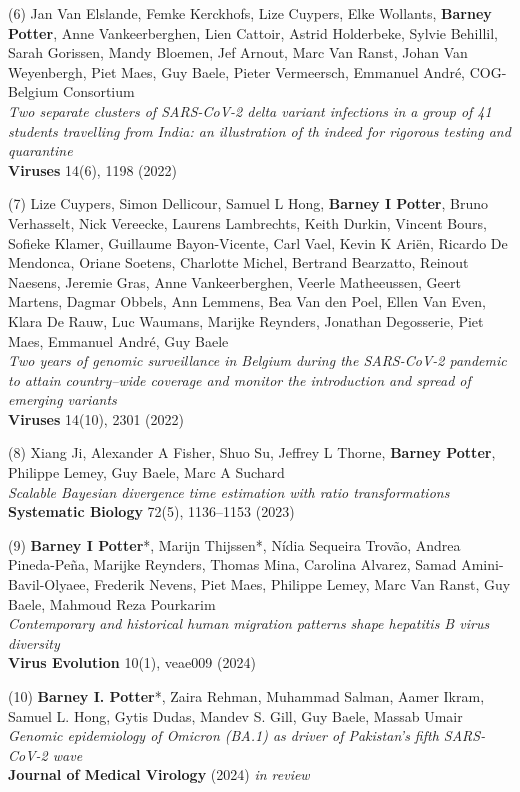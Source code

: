 (6) Jan Van Elslande, Femke Kerckhofs, Lize Cuypers, Elke Wollants, \textbf{Barney Potter}, Anne Vankeerberghen, Lien Cattoir, Astrid Holderbeke, Sylvie Behillil, Sarah Gorissen, Mandy Bloemen, Jef Arnout, Marc Van Ranst, Johan Van Weyenbergh, Piet Maes, Guy Baele, Pieter Vermeersch, Emmanuel André, COG-Belgium Consortium\\
\textit{Two separate clusters of SARS-CoV-2 delta variant infections in a group of 41 students travelling from India: an illustration of th indeed for rigorous testing and quarantine}\\
\textbf{Viruses} 14(6), 1198 (2022)

(7) Lize Cuypers, Simon Dellicour, Samuel L Hong, \textbf{Barney I Potter}, Bruno Verhasselt, Nick Vereecke, Laurens Lambrechts, Keith Durkin, Vincent Bours, Sofieke Klamer, Guillaume Bayon-Vicente, Carl Vael, Kevin K Ariën, Ricardo De Mendonca, Oriane Soetens, Charlotte Michel, Bertrand Bearzatto, Reinout Naesens, Jeremie Gras, Anne Vankeerberghen, Veerle Matheeussen, Geert Martens, Dagmar Obbels, Ann Lemmens, Bea Van den Poel, Ellen Van Even, Klara De Rauw, Luc Waumans, Marijke Reynders, Jonathan Degosserie, Piet Maes, Emmanuel André, Guy Baele\\
\textit{Two years of genomic surveillance in Belgium during the SARS-CoV-2 pandemic to attain country–wide coverage and monitor the introduction and spread of emerging variants}\\
\textbf{Viruses} 14(10), 2301 (2022)

(8) Xiang Ji, Alexander A Fisher, Shuo Su, Jeffrey L Thorne, \textbf{Barney Potter}, Philippe Lemey, Guy Baele, Marc A Suchard\\
\textit{Scalable Bayesian divergence time estimation with ratio transformations}\\
\textbf{Systematic Biology} 72(5), 1136–1153 (2023)

(9) \textbf{Barney I Potter}*, Marijn Thijssen*, Nídia Sequeira Trovão, Andrea Pineda-Peña, Marijke Reynders, Thomas Mina, Carolina Alvarez, Samad Amini-Bavil-Olyaee, Frederik Nevens, Piet Maes, Philippe Lemey, Marc Van Ranst, Guy Baele, Mahmoud Reza Pourkarim\\
\textit{Contemporary and historical human migration patterns shape hepatitis B virus diversity}\\
\textbf{Virus Evolution} 10(1), veae009 (2024)

(10) \textbf{Barney I. Potter}*, Zaira Rehman, Muhammad Salman, Aamer Ikram, Samuel L. Hong, Gytis Dudas, Mandev S. Gill, Guy Baele, Massab Umair\\
\textit{Genomic epidemiology of Omicron (BA.1) as driver of Pakistan's fifth SARS-CoV-2 wave}\\
\textbf{Journal of Medical Virology} (2024) \textit{in review}


\cleardoublepage

